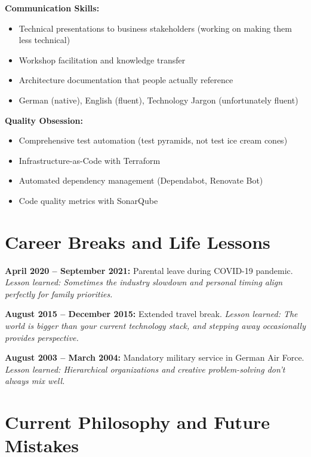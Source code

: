 \documentclass[11pt,a4paper]{article}
\begin{document}
\textbf{Communication Skills:}
\begin{itemize}[leftmargin=15pt, topsep=0pt, itemsep=1pt]
\item Technical presentations to business stakeholders (working on making them less technical)
\item Workshop facilitation and knowledge transfer
\item Architecture documentation that people actually reference
\item German (native), English (fluent), Technology Jargon (unfortunately fluent)
\end{itemize}

\textbf{Quality Obsession:}
\begin{itemize}[leftmargin=15pt, topsep=0pt, itemsep=1pt]
\item Comprehensive test automation (test pyramids, not test ice cream cones)
\item Infrastructure-as-Code with Terraform
\item Automated dependency management (Dependabot, Renovate Bot)
\item Code quality metrics with SonarQube
\end{itemize}

\vspace{6pt}

\section{Career Breaks and Life Lessons}

\textbf{April 2020 -- September 2021:} Parental leave during COVID-19 pandemic. \textit{Lesson learned: Sometimes the industry slowdown and personal timing align perfectly for family priorities.}

\textbf{August 2015 -- December 2015:} Extended travel break. \textit{Lesson learned: The world is bigger than your current technology stack, and stepping away occasionally provides perspective.}

\textbf{August 2003 -- March 2004:} Mandatory military service in German Air Force. \textit{Lesson learned: Hierarchical organizations and creative problem-solving don't always mix well.}

\vspace{6pt}

\section{Current Philosophy and Future Mistakes}
\end{document}
